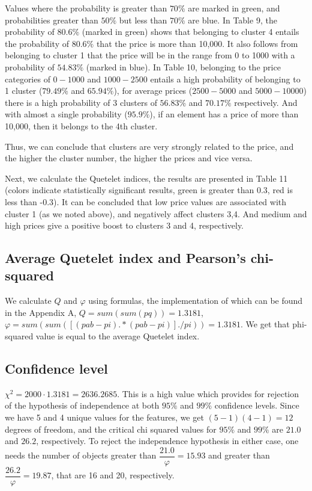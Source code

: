 \documentclass[12pt,a4paper]{article}
\begin{document}
	Values where the probability is greater than $70\%$ are marked in green, and probabilities greater than $50\%$ but less than $70\%$ are blue. In Table 9, the probability of $80.6\%$ (marked in green) shows that belonging to cluster 4 entails the probability of $80.6\%$ that the price is more than 10,000. It also follows from belonging to cluster 1 that the price will be in the range from 0 to 1000 with a probability of $54.83\%$ (marked in blue). In Table 10, belonging to the price categories of $0-1000$ and $1000-2500$ entails a high probability of belonging to 1 cluster ($79.49\%$ and $65.94\%$), for average prices ($2500-5000$ and $5000-10000$) there is a high probability of 3 clusters of $56.83\%$ and $70.17\%$ respectively. And with almost a single probability ($95.9\%$), if an element has a price of more than 10,000, then it belongs to the 4th cluster.
	
	Thus, we can conclude that clusters are very strongly related to the price, and the higher the cluster number, the higher the prices and vice versa.
	
	Next, we calculate the Quetelet indices, the results are presented in Table 11 (colors indicate statistically significant results, green is greater than 0.3, red is less than -0.3). It can be concluded that low price values are associated with cluster 1 (as we noted above), and negatively affect clusters 3,4. And medium and high prices give a positive boost to clusters 3 and 4, respectively.
	
	\subsection{Average Quetelet index and Pearson’s chi-squared}
	
	We calculate $Q$ and $\varphi$ using formulas, the implementation of which can be found in the Appendix A,
	$Q=sum(sum(pq)) = 1.3181$, $\varphi = sum(sum([(pab-pi).*(pab-pi)]./pi)) = 1.3181$. We get that phi-squared value is equal to the average Quetelet index.
	
	\subsection{Confidence level}
	
	$\chi^2 = 2000\cdot1.3181 = 2636.2685$. This is a high value which provides for rejection of the hypothesis of independence at both $95\%$ and $99\%$ confidence levels. Since we have 5 and 4 unique values for the features, we get $(5-1)(4-1)=12$ degrees of freedom, and the critical chi squared values for $95\%$ and $99\%$ are $21.0$ and $26.2$, respectively. To reject the independence hypothesis in either case, one needs the number of objects greater than $\dfrac{21.0}{\varphi}=15.93$ and greater than $\dfrac{26.2}{\varphi}=19.87$, that are 16 and 20, respectively.
	
\end{document}
